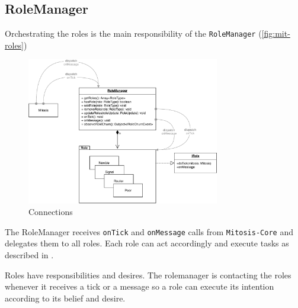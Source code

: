 \subsection{RoleManager}\label{sec:mit-roleManager}
Orchestrating the roles is the main responsibility of the \lstinline|RoleManager| (\vref{fig:mit-roles})

\begin{figure}
\centering
\includegraphics[width=0.75\textwidth]{graphics/implementation/mitosis-architecture-roles.pdf}
\caption{Connections}
\label{fig:mit-roles}
\end{figure}

The RoleManager receives \lstinline|onTick| and \lstinline|onMessage| calls from \lstinline|Mitosis-Core| and delegates them to all roles. Each role can act accordingly and execute tasks as described in . 

Roles have responsibilities and desires. The rolemanager is contacting the roles whenever it receives a tick or a message so a role can execute its intention according to its belief and desire.